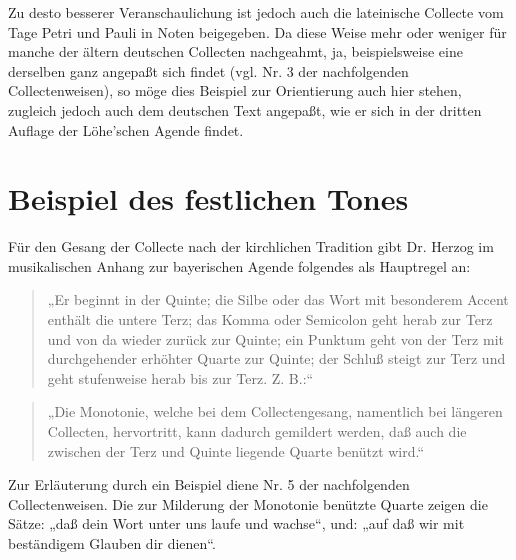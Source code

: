 Zu desto besserer Veranschaulichung ist jedoch auch die lateinische Collecte vom Tage Petri und Pauli in Noten beigegeben. Da diese Weise mehr oder weniger für manche der ältern deutschen Collecten nachgeahmt, ja, beispielsweise eine derselben ganz angepaßt sich findet (vgl. Nr. 3 der nachfolgenden Collectenweisen), so möge dies Beispiel zur Orientierung auch hier stehen, zugleich jedoch auch dem deutschen Text angepaßt, wie er sich in der dritten Auflage der Löhe’schen Agende findet.

\section{Beispiel des festlichen Tones}



Für den Gesang der Collecte nach der kirchlichen Tradition gibt Dr. Herzog im musikalischen Anhang zur bayerischen Agende folgendes als Hauptregel an:

\begin{quote}
„Er beginnt in der Quinte; die Silbe oder das Wort mit besonderem Accent enthält die untere Terz; das Komma oder Semicolon geht herab zur Terz und von da wieder zurück zur Quinte; ein Punktum geht von der Terz mit durchgehender erhöhter Quarte zur Quinte; der Schluß steigt zur Terz und geht stufenweise herab bis zur Terz. Z. B.:“
\end{quote}


\begin{quote}
„Die Monotonie, welche bei dem Collectengesang, namentlich bei längeren Collecten, hervortritt, kann dadurch gemildert werden, daß auch die zwischen der Terz und Quinte liegende Quarte benützt wird.“
\end{quote}

Zur Erläuterung durch ein Beispiel diene Nr. 5 der nachfolgenden Collectenweisen. Die zur Milderung der Monotonie benützte Quarte zeigen die Sätze: „daß dein Wort unter uns laufe und wachse“, und: „auf daß wir mit beständigem Glauben dir dienen“.

